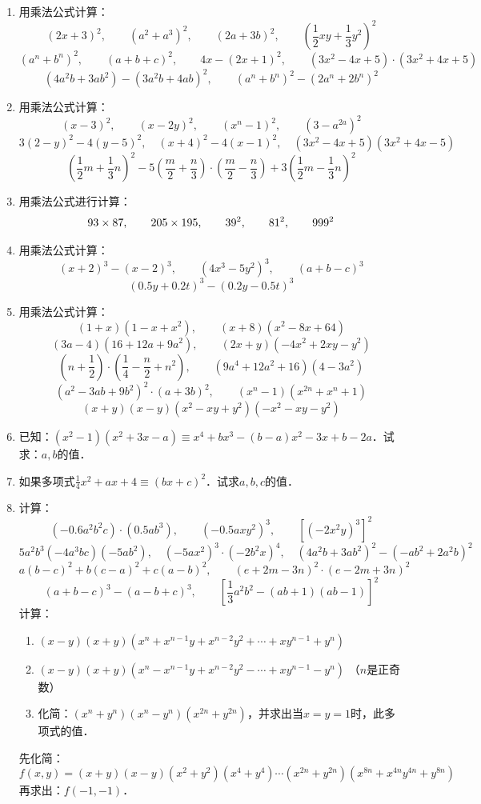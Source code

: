 \begin{enumerate}
\item 用乘法公式计算：
\[(2x+3)^2,\qquad  (a^2+a^3)^2,\qquad  (2a+3b)^2,\qquad  \left(\frac{1}{2}xy+\frac{1}{3}y^2\right)^2\]
\[(a^n+b^n)^2,\qquad  (a+b+c)^2,\qquad  4x- (2x+1)^2,\qquad  (3x^2-4x+5) \cdot  (3x^2+4x+5) \]
\[(4a^2b+3ab^2) - (3a^2b+4ab)^ 2,\qquad (a^n+b^n)^2-(2a^n+2b^n)^2\]

\item 用乘法公式计算：
\[(x-3)^2,\qquad (x-2y)^2,\qquad (x^n-1)^2,\qquad \left(3-a^{2a}\right)^2 \]
\[3(2-y)^2-4(y-5)^2,\quad (x+4)^2-4(x-1)^2,\quad (3x^2-4x+5)(3x^2+4x-5) \]
\[\left(\frac{1}{2}m+\frac{1}{3}n\right)^2 -5\left(\frac{m}{2}+\frac{n}{3}\right)\cdot \left(\frac{m}{2}-\frac{n}{3}\right)+3\left(\frac{1}{2}m-\frac{1}{3}n\right)^2  \]

\item 用乘法公式进行计算：
\[93\times 87,\qquad 205\times 195,\qquad 39^2,\qquad 81^2,\qquad 999^2 \]

\item 用乘法公式计算：
\[(x+2)^3-(x-2)^3,\qquad (4x^3-5y^2)^3,\qquad (a+b-c)^3  \]
\[ (0.5y+0.2t)^3-(0.2y-0.5t)^3 \]

\item 用乘法公式计算：
\[(1+x)(1-x+x^2),\qquad (x+8)(x^2-8x+64) \]
\[(3a-4)(16+12a+9a^2),\qquad (2x+y)(-4x^2+2xy-y^2)\]
\[\left(n+\frac{1}{2}\right)\cdot \left(\frac{1}{4}-\frac{n}{2}+n^2\right),\qquad (9a^4+12a^2+16)(4-3a^2)\]
\[(a^2-3ab+9b^2)^2\cdot (a+3b)^2,\qquad (x^n-1)(x^{2n}+x^n+1)\]
\[(x+y)(x-y)(x^2-xy+y^2)(-x^2-xy-y^2)\]

\item 已知：$(x^2-1)(x^2+3x-a)\equiv x^4+bx^3-(b-a)x^2-3x+b-2a$．试求：$a,b$的值．
\item  如果多项式$\frac{1}{4}x^2+ax+4\equiv (bx+c)^2$．试求$a,b,c$的值．
\item 计算：
\[(-0.6a^2b^2c)\cdot (0.5ab^3),\qquad (-0.5axy^2)^3,\qquad [(-2x^2y)^3]^2\]
\[5a^2b^3 (-4a^3bc)(-5ab^2),\quad (-5ax^2)^3\cdot (-2b^2x)^4,\quad (4a^2b+3ab^2)^2-(-ab^2+2a^2b)^2\]
\[a(b-c)^2+b(c-a)^2+c(a-b)^2,\qquad (e+2m-3n)^2\cdot (e-2m+3n)^2\]
\[(a+b-c)^3-(a-b+c)^3,\qquad \left[\frac{1}{3}a^2b^2-(ab+1)(ab-1)\right]^2\]
\staritem 计算：
\begin{enumerate}
    \item $(x-y)(x+y)(x^n+x^{n-1}y+x^{n-2}y^2+\cdots +xy^{n-1}+y^n)$
    \item $(x-y)(x+y)(x^n-x^{n-1}y+x^{n-2}y^2-\cdots +xy^{n-1}-y^n)$ （$n$是正奇数）
    \item 化简：$(x^n+y^n)(x^n-y^n)(x^{2n}+y^{2n})$，并求出当$x=y=1$时，此多项式的值．
\end{enumerate}

\staritem 先化简：
\[f(x,y)=(x+y)(x-y)(x^2+y^2)(x^4+y^4)\cdots (x^{2n}+y^{2n})\left(x^{8n}+x^{4n}y^{4n}+y^{8n}\right)  \]
再求出：$f(-1,-1)$．
\end{enumerate}

